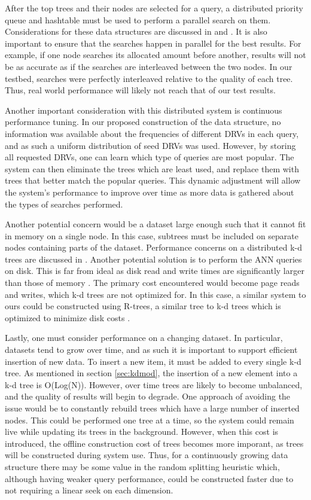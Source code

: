 After the top trees and their nodes are selected for a query, a distributed priority queue and hashtable must be used to perform a parallel search on them.  Considerations for these data structures are discussed in \citep{kaashoek2003koorde} and \citep{rogers1995supporting}.  It is also important to ensure that the searches happen in parallel for the best results.  For example, if one node searches its allocated amount before another, results will not be as accurate as if the searches are interleaved between the two nodes.  In our testbed, searches were perfectly interleaved relative to the quality of each tree.  Thus, real world performance will likely not reach that of our test results.

Another important consideration with this distributed system is continuous performance tuning.  In our proposed construction of the data structure, no information was available about the frequencies of different DRVs in each query, and as such a uniform distribution of seed DRVs was used.  However, by storing all requested DRVs, one can learn which type of queries are most popular.  The system can then eliminate the trees which are least used, and replace them with trees that better match the popular queries.  This dynamic adjustment will allow the system's performance to improve over time as more data is gathered about the types of searches performed.

Another potential concern would be a dataset large enough such that it cannot fit in memory on a single node.  In this case, subtrees must be included on separate nodes containing parts of the dataset.  Performance concerns on a distributed k-d trees are discussed in \citep{aly2011distributed}.  Another potential solution is to perform the ANN queries on disk.  This is far from ideal as disk read and write times are significantly larger than those of memory \citep{karedla1994caching}.  The primary cost encountered would become page reads and writes, which k-d trees are not optimized for.  In this case, a similar system to ours could be constructed using R-trees, a similar tree to k-d trees which is optimized to minimize disk costs \citep{guttman1984r}.

Lastly, one must consider performance on a changing dataset.  In particular, datasets tend to grow over time, and as such it is important to support efficient insertion of new data.  To insert a new item, it must be added to every single k-d tree.  As mentioned in section \ref{sec:kdmod}, the insertion of a new element into a k-d tree is O(Log(N)).  However, over time trees are likely to become unbalanced, and the quality of results will begin to degrade.  One approach of avoiding the issue would be to constantly rebuild trees which have a large number of inserted nodes.  This could be performed one tree at a time, so the system could remain live while updating its trees in the background.  However, when this cost is introduced, the offline construction cost of trees becomes more imporant, as trees will be constructed during system use.  Thus, for a continuously growing data structure there may be some value in the random splitting heuristic which, although having weaker query performance, could be constructed faster due to not requiring a linear seek on each dimension.

